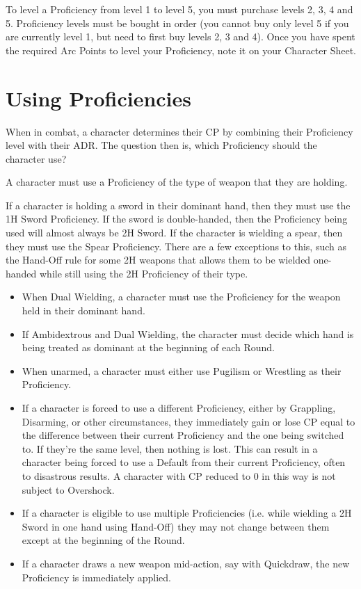 \documentclass[oneside,11pt,english]{book}
\begin{document}
To level a Proficiency from level 1 to level 5, you must purchase levels 2, 3, 4 and 5. Proficiency levels 
must be bought in order (you cannot buy only level 5 if you are currently level 1, but need to first buy 
levels 2, 3 and 4). Once you have spent the required Arc Points to level your Proficiency, note it on your 
Character Sheet. 

\section{Using Proficiencies}
When in combat, a character determines their CP by combining their Proficiency level with their ADR. 
The question then is, which Proficiency should the character use? 

A character must use a Proficiency of the type of weapon that they are holding.  

If a character is holding a sword in their dominant hand, then they must use the 1H Sword Proficiency. If 
the sword is double-handed, then the Proficiency being used will almost always be 2H Sword. If the 
character is wielding a spear, then they must use the Spear Proficiency. There are a few exceptions to this, 
such as the Hand-Off rule for some 2H weapons that allows them to be wielded one-handed while still 
using the 2H Proficiency of their type. 
\begin{itemize}
	\item When Dual Wielding, a character must use the Proficiency for the weapon held in their dominant hand. 
	\item If Ambidextrous and Dual Wielding, the character must decide which hand is being treated as dominant at the beginning of each Round.
	\item When unarmed, a character must either use Pugilism or Wrestling as their Proficiency. 
	\item If a character is forced to use a different Proficiency, either by Grappling, Disarming, or other circumstances, they immediately gain or lose CP equal to the difference between their current Proficiency and the one being switched to. If they’re the same level, then nothing is lost. This can result in a character being forced to use a Default from their current Proficiency, often to disastrous results. A character with CP reduced to 0 in this way is not subject to Overshock.
	\item If a character is eligible to use multiple Proficiencies (i.e. while wielding a 2H Sword in one hand using Hand-Off) they may not change between them except at the beginning of the Round.
	\item If a character draws a new weapon mid-action, say with Quickdraw, the new Proficiency is immediately applied.
\end{itemize}
\end{document}
